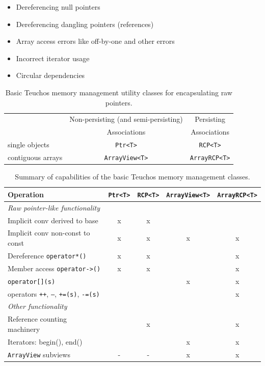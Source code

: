 \documentclass[pdf,ps2pdf,11pt]{SANDreport}
\begin{document}
\begin{itemize}
  \begin{itemize}
  {}\item Dereferencing null pointers
  {}\item Dereferencing dangling pointers (references)
  {}\item Array access errors like off-by-one and other errors
  {}\item Incorrect iterator usage
  {}\item Circular dependencies
  \end{itemize}

\end{itemize}


\begin{table}
\begin{center}
\begin{tabular}{|l|c|c|}
\hline
& Non-persisting (and semi-persisting)
& Persisting \\
& Associations
& Associations \\
\hline
single objects
& {}\texttt{Ptr<T>}
& {}\texttt{RCP<T>} \\
\hline
contiguous arrays
& {}\texttt{ArrayView<T>}
& {}\texttt{ArrayRCP<T>} \\
\hline
\end{tabular}
\end{center}
\caption{\label{tbl:BasicSingleArrayTypes}
Basic Teuchos memory management utility classes for encapsulating raw
pointers.}
\end{table}


\begin{table}
\begin{center}
\begin{tabular}{|l|c|c|c|c|}
%
\hline
%
Operation
& \texttt{Ptr<T>}
& \texttt{RCP<T>}
& \texttt{ArrayView<T>}
& \texttt{ArrayRCP<T>} \\
%
\hline
%
\multicolumn{5}{l}{\textit{Raw pointer-like functionality}} \\
%
\hline
%
Implicit conv derived to base
& x
& x
& 
&  \\
%
\hline
%
Implicit conv non-const to const
& x
& x
& x
& x \\
%
\hline
%
Dereference \texttt{operator*()}
& x
& x
& 
& x \\
%
\hline
%
Member access \texttt{operator->()}
& x
& x
& 
& x \\
%
\hline
%
\texttt{operator[](s)}
& 
& 
& x
& x \\
%
\hline
%
operators \texttt{++}, \texttt{--}, \texttt{+=(s)}, \texttt{-=(s)}
& 
& 
& 
& x \\
%
\hline
%
\multicolumn{5}{l}{\textit{Other functionality}} \\
%
\hline
%
Reference counting machinery
& 
& x
& 
& x \\
%
\hline
%
Iterators: begin(), end()
& 
& 
& x
& x \\
%
\hline
%
\texttt{ArrayView} subviews
& -
& -
& x
& x \\
%
\hline
%
\end{tabular}
\end{center}
\caption{\label{tbl:TypesSummary}
Summary of capabilities of the basic Teuchos memory management
classes.}
\end{table}
\end{document}
